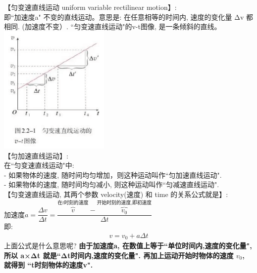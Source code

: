 \documentclass[UTF8]{ctexart}
\begin{document}
【匀变速直线运动  uniform variable rectilinear motion】: \\
即``加速度a" 不变的直线运动。意思是: 在任意相等的时间内, 速度的变化量 Δv 都相同. (加速度不变）. ``匀变速直线运动"的v-t图像, 是一条倾斜的直线。\\	
\includegraphics[width=0.4\textwidth]{img/0108.png}	\\
	
	
【匀加速直线运动】:\\
在``匀变速直线运动"中:\\
- 如果物体的速度, 随时间均匀增加，则这种运动叫作``匀加速直线运动". \\
- 如果物体的速度, 随时间均匀减小, 则这种运动叫作``匀减速直线运动". \\


【匀变速直线运动, 其两个参数 velocity(速度) 和 time 的关系公式就是】:\\
$	\text{加速度}a=\dfrac{\varDelta v}{\varDelta t}=\dfrac{\overset{\text{在}t\text{时刻的速度}}{\overbrace{v}}-\overset{\text{开始时刻的速度,即初速度}}{\overbrace{v_0}}}{\varDelta t}$ \\
即:
\begin{align*}
	\boxed{
		v=v_0+a\varDelta t
	}
\end{align*}
上面公式是什么意思呢?  \textbf{由于加速度a, 在数值上等于``单位时间内,速度的变化量", 所以 a×Δt 就是``Δt时间内,速度的变化量". 再加上运动开始时物体的速度 $v_0$, 就得到 ``t时刻物体的速度v".} \\
\end{document}
